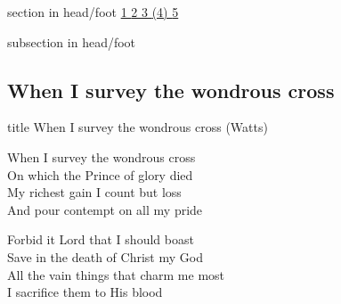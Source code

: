 \documentclass[aspectratio=169]{beamer}
\begin{document}
{
{ 
 {
 \begin{beamercolorbox}[ht=4.5ex,dp=1.5ex,%
      leftskip=.3cm,rightskip=.3cm plus1fil]{section in head/foot}
 \fontsize{12}{25}\selectfont 
\hyperlink{When I survey the wondrous cross[](Watts)1}{1  }\hyperlink{When I survey the wondrous cross[](Watts)2}{2  }\hyperlink{When I survey the wondrous cross[](Watts)3}{3  }\hyperlink{When I survey the wondrous cross[](Watts)(4)}{(4)  }\hyperlink{When I survey the wondrous cross[](Watts)5}{5  } 
 \end{beamercolorbox}%
  \begin{beamercolorbox}[ht=2.5ex,dp=1.125ex,%
   leftskip=.3cm,rightskip=.3cm plus1fil]{subsection in head/foot}
   \insertauthor
 \end{beamercolorbox}%
 }
}
\subsection{When I survey the wondrous cross}
\hypertarget{When I survey the wondrous cross[](Watts)}{}
\begin{frame}{}
 \vfill
  \centering
  \begin{beamercolorbox}[sep=8pt,center,shadow=true,rounded=true]{title}
    When I survey the wondrous cross (Watts)    
  \end{beamercolorbox}
  \vfill
\end{frame}

\hypertarget{When I survey the wondrous cross[](Watts)1}{}
\begin{frame}{}
\fontsize{23.68421052631579}{28.42105263157895}\selectfont

When I survey the wondrous cross\\ 
On which the Prince of glory died\\ 
My richest gain I count but loss\\ 
And pour contempt on all my pride

\end{frame}
\hypertarget{When I survey the wondrous cross[](Watts)2}{}
\begin{frame}{}
\fontsize{23.68421052631579}{28.42105263157895}\selectfont

Forbid it Lord that I should boast\\ 
Save in the death of Christ my God\\ 
All the vain things that charm me most\\ 
I sacrifice them to His blood


\end{frame}}
\end{document}
